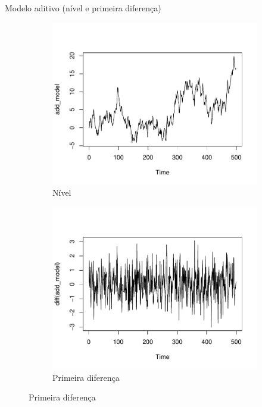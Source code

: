 \documentclass[11pt]{beamer}
\begin{document}
\begin{frame}{Modelo aditivo (nível e primeira diferença)}
	\begin{figure}
		\begin{subfigure}{0.45\textwidth}
			\centering
			\includegraphics[scale=0.4]{graficos/aditivo_nivel.pdf}
			\caption{Nível}
\end{subfigure}
		\begin{subfigure}{0.45\textwidth}
	\centering
	\includegraphics[scale=0.4]{graficos/aditivo_diff.pdf}
	\caption{Primeira diferença}
\end{subfigure}
	\end{figure}
\end{frame}
\end{document}
